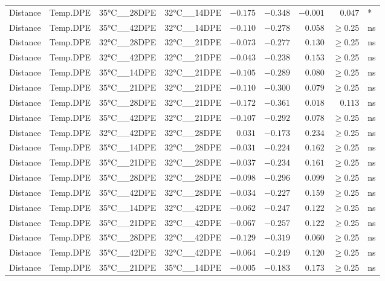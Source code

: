 \documentclass[
]{article}
\begin{document}
\begin{longtable}{llllrrrrl}
Distance & Temp.DPE & 35°C\_\_28DPE & 32°C\_\_14DPE & $-0.175$ & $-0.348$ & $-0.001$ & $0.047$ & * \\ 
Distance & Temp.DPE & 35°C\_\_42DPE & 32°C\_\_14DPE & $-0.110$ & $-0.278$ & $0.058$ & $\geq$0.25 & ns \\ 
Distance & Temp.DPE & 32°C\_\_28DPE & 32°C\_\_21DPE & $-0.073$ & $-0.277$ & $0.130$ & $\geq$0.25 & ns \\ 
Distance & Temp.DPE & 32°C\_\_42DPE & 32°C\_\_21DPE & $-0.043$ & $-0.238$ & $0.153$ & $\geq$0.25 & ns \\ 
Distance & Temp.DPE & 35°C\_\_14DPE & 32°C\_\_21DPE & $-0.105$ & $-0.289$ & $0.080$ & $\geq$0.25 & ns \\ 
Distance & Temp.DPE & 35°C\_\_21DPE & 32°C\_\_21DPE & $-0.110$ & $-0.300$ & $0.079$ & $\geq$0.25 & ns \\ 
Distance & Temp.DPE & 35°C\_\_28DPE & 32°C\_\_21DPE & $-0.172$ & $-0.361$ & $0.018$ & $0.113$ & ns \\ 
Distance & Temp.DPE & 35°C\_\_42DPE & 32°C\_\_21DPE & $-0.107$ & $-0.292$ & $0.078$ & $\geq$0.25 & ns \\ 
Distance & Temp.DPE & 32°C\_\_42DPE & 32°C\_\_28DPE & $0.031$ & $-0.173$ & $0.234$ & $\geq$0.25 & ns \\ 
Distance & Temp.DPE & 35°C\_\_14DPE & 32°C\_\_28DPE & $-0.031$ & $-0.224$ & $0.162$ & $\geq$0.25 & ns \\ 
Distance & Temp.DPE & 35°C\_\_21DPE & 32°C\_\_28DPE & $-0.037$ & $-0.234$ & $0.161$ & $\geq$0.25 & ns \\ 
Distance & Temp.DPE & 35°C\_\_28DPE & 32°C\_\_28DPE & $-0.098$ & $-0.296$ & $0.099$ & $\geq$0.25 & ns \\ 
Distance & Temp.DPE & 35°C\_\_42DPE & 32°C\_\_28DPE & $-0.034$ & $-0.227$ & $0.159$ & $\geq$0.25 & ns \\ 
Distance & Temp.DPE & 35°C\_\_14DPE & 32°C\_\_42DPE & $-0.062$ & $-0.247$ & $0.122$ & $\geq$0.25 & ns \\ 
Distance & Temp.DPE & 35°C\_\_21DPE & 32°C\_\_42DPE & $-0.067$ & $-0.257$ & $0.122$ & $\geq$0.25 & ns \\ 
Distance & Temp.DPE & 35°C\_\_28DPE & 32°C\_\_42DPE & $-0.129$ & $-0.319$ & $0.060$ & $\geq$0.25 & ns \\ 
Distance & Temp.DPE & 35°C\_\_42DPE & 32°C\_\_42DPE & $-0.064$ & $-0.249$ & $0.120$ & $\geq$0.25 & ns \\ 
Distance & Temp.DPE & 35°C\_\_21DPE & 35°C\_\_14DPE & $-0.005$ & $-0.183$ & $0.173$ & $\geq$0.25 & ns \\ 

\end{longtable}
\end{document}
